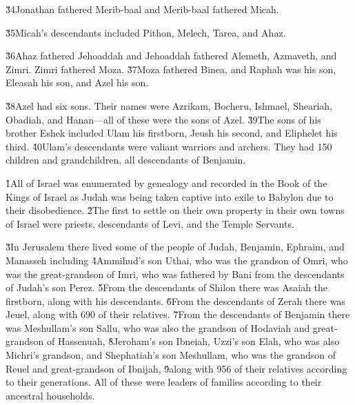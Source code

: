 \v{34}Jonathan fathered Merib-baal and Merib-baal fathered Micah.

\v{35}Micah's descendants included Pithon, Melech, Tarea, and Ahaz.

\v{36}Ahaz fathered Jehoaddah and Jehoaddah fathered Alemeth, Azmaveth, and Zimri. Zimri fathered Moza. \v{37}Moza fathered Binea, and Raphah was his son, Eleasah his son, and Azel his son.

\v{38}Azel had six sons. Their names were Azrikam, Bocheru, Ishmael, Sheariah, Obadiah, and Hanan---all of these were the sons of Azel. \v{39}The sons of his brother Eshek included Ulam his firstborn, Jeush his second, and Eliphelet his third. \v{40}Ulam's descendants were valiant warriors and archers. They had 150 children and grandchildren, all descendants of Benjamin.

\v{1}All of Israel was enumerated by genealogy and recorded in the Book of the Kings of Israel as Judah was being taken captive into exile to Babylon due to their disobedience. \v{2}The first to settle on their own property in their own towns of Israel were priests, descendants of Levi, and the Temple Servants.

\v{3}In Jerusalem there lived some of the people of Judah, Benjamin, Ephraim, and Manasseh including \v{4}Ammihud's son Uthai, who was the grandson of Omri, who was the great-grandson of Imri, who was fathered by Bani from the descendants of Judah's son Perez. \v{5}From the descendants of Shilon there was Asaiah the firstborn, along with his descendants. \v{6}From the descendants of Zerah there was Jeuel, along with 690 of their relatives. \v{7}From the descendants of Benjamin there was Meshullam's son Sallu, who was also the grandson of Hodaviah and great-grandson of Hassenuah, \v{8}Jeroham's son Ibneiah, Uzzi's son Elah, who was also Michri's grandson, and Shephatiah's son Meshullam, who was the grandson of Reuel and great-grandson of Ibnijah, \v{9}along with 956 of their relatives according to their generations. All of these were leaders of families according to their ancestral households.

